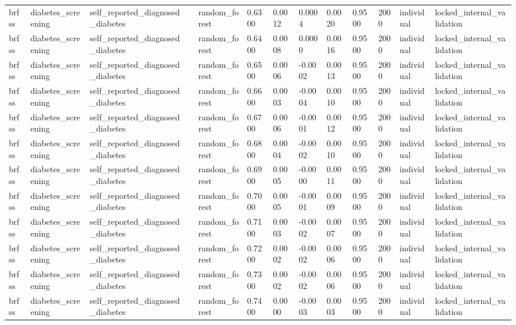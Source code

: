 \begin{tabular}{lllllllllllll}
brfss & diabetes\_screening & self\_reported\_diagnosed\_diabetes &  & random\_forest & 0.6300 & 0.0012 & 0.0004 & 0.0020 & 0.9500 & 2000 & individual & locked\_internal\_validation \\
brfss & diabetes\_screening & self\_reported\_diagnosed\_diabetes &  & random\_forest & 0.6400 & 0.0008 & 0.0000 & 0.0016 & 0.9500 & 2000 & individual & locked\_internal\_validation \\
brfss & diabetes\_screening & self\_reported\_diagnosed\_diabetes &  & random\_forest & 0.6500 & 0.0006 & -0.0002 & 0.0013 & 0.9500 & 2000 & individual & locked\_internal\_validation \\
brfss & diabetes\_screening & self\_reported\_diagnosed\_diabetes &  & random\_forest & 0.6600 & 0.0003 & -0.0004 & 0.0010 & 0.9500 & 2000 & individual & locked\_internal\_validation \\
brfss & diabetes\_screening & self\_reported\_diagnosed\_diabetes &  & random\_forest & 0.6700 & 0.0006 & -0.0001 & 0.0012 & 0.9500 & 2000 & individual & locked\_internal\_validation \\
brfss & diabetes\_screening & self\_reported\_diagnosed\_diabetes &  & random\_forest & 0.6800 & 0.0004 & -0.0002 & 0.0010 & 0.9500 & 2000 & individual & locked\_internal\_validation \\
brfss & diabetes\_screening & self\_reported\_diagnosed\_diabetes &  & random\_forest & 0.6900 & 0.0005 & -0.0000 & 0.0011 & 0.9500 & 2000 & individual & locked\_internal\_validation \\
brfss & diabetes\_screening & self\_reported\_diagnosed\_diabetes &  & random\_forest & 0.7000 & 0.0005 & -0.0001 & 0.0009 & 0.9500 & 2000 & individual & locked\_internal\_validation \\
brfss & diabetes\_screening & self\_reported\_diagnosed\_diabetes &  & random\_forest & 0.7100 & 0.0003 & -0.0002 & 0.0007 & 0.9500 & 2000 & individual & locked\_internal\_validation \\
brfss & diabetes\_screening & self\_reported\_diagnosed\_diabetes &  & random\_forest & 0.7200 & 0.0002 & -0.0002 & 0.0006 & 0.9500 & 2000 & individual & locked\_internal\_validation \\
brfss & diabetes\_screening & self\_reported\_diagnosed\_diabetes &  & random\_forest & 0.7300 & 0.0002 & -0.0002 & 0.0006 & 0.9500 & 2000 & individual & locked\_internal\_validation \\
brfss & diabetes\_screening & self\_reported\_diagnosed\_diabetes &  & random\_forest & 0.7400 & 0.0000 & -0.0003 & 0.0003 & 0.9500 & 2000 & individual & locked\_internal\_validation \\

\end{tabular}
